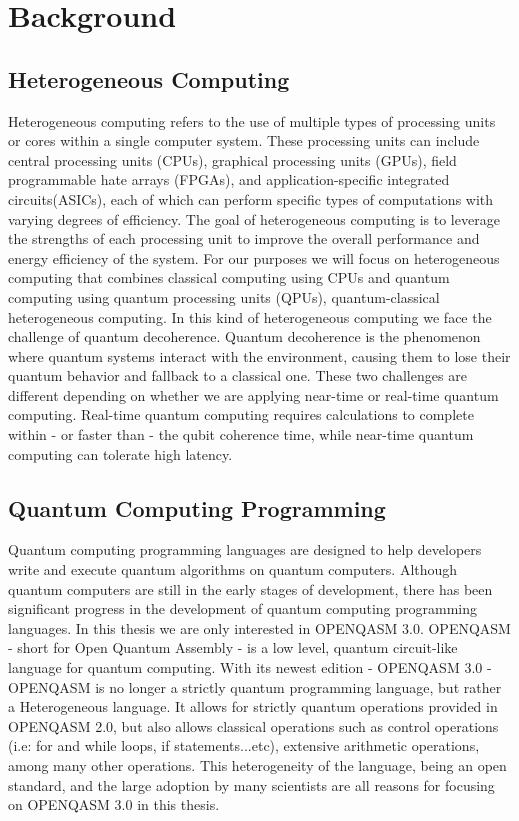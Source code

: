 \chapter{Background}
\label{chapter:Background}
\section{Heterogeneous Computing}
Heterogeneous computing refers to the use of multiple types of processing units
or cores within a single computer system. These processing units can include
central processing units (CPUs), graphical processing units (GPUs), 
field programmable hate arrays (FPGAs), and application-specific integrated circuits(ASICs), each of which can perform
specific types of computations with varying degrees of efficiency. The goal of
heterogeneous computing is to leverage the strengths of each processing unit to
improve the overall performance and energy efficiency of the system. For our
purposes we will focus on heterogeneous computing that combines classical
computing using CPUs and quantum computing using quantum processing units (QPUs), quantum-classical
heterogeneous computing.
In this kind of heterogeneous computing we face the challenge of quantum
decoherence. Quantum decoherence is the phenomenon where quantum systems interact
with the environment, causing them to lose their
quantum behavior and fallback to a classical one.
These two challenges are different depending on whether we are applying
near-time or real-time quantum computing. Real-time quantum computing requires calculations to
complete within - or faster than - the qubit coherence time, while near-time quantum computing can tolerate high
latency.
\section{Quantum Computing Programming}
Quantum computing programming languages are designed to help developers write
and execute quantum algorithms on quantum computers. Although quantum computers
are still in the early stages of development, there has been significant
progress in the development of quantum computing programming languages. In this
thesis we are only interested in OPENQASM 3.0. OPENQASM - short for Open Quantum
Assembly - is a low level, quantum circuit-like language for quantum computing.
With its newest edition - OPENQASM 3.0 - OPENQASM is no longer a strictly
quantum programming language, but rather a Heterogeneous language. It allows for
strictly quantum operations provided in OPENQASM 2.0, but also allows classical
operations such as control operations (i.e: for and while loops, if
statements...etc), extensive arithmetic operations, among many other operations.
This heterogeneity of the language, being an open standard, and the large
adoption by many scientists are all reasons for focusing on OPENQASM 3.0 in this
thesis.
